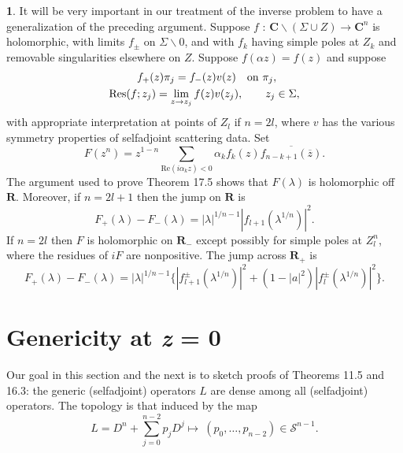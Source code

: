 \documentclass{surv-l}
\theoremstyle{plain}
\theoremstyle{definition}
\newtheorem{rrk}[theorem]{\sc{Remarks}}
\numberwithin{equation}{chapter}
\begin{document}
\begin{rrk}\label{rem17.16}
It will be very important in our treatment of the inverse problem to have a generalization of the preceding argument. Suppose $f$ : $\mathbf{C}\backslash (\Sigma\cup Z)\rightarrow \mathbf{C}^{n}$ is holomorphic, with limits $ f_{\pm}$ on $\Sigma\backslash 0$, and with $f_{k}$ having simple poles at $Z_{k}$ and removable singularities elsewhere on $Z$. Suppose $f(\alpha z)=f(z)$ and suppose
\setcounter{equation}{16}
\begin{align}
&f_{+}(z)\pi_{j}=f_{-}(z)v(z)\quad \mathrm{on}\ \pi_{j},\\ \notag
\mathrm{Res}(f&;z_{j})=\lim_{z\rightarrow z_{j}}f(z)v(z_{j}),\qquad z_{j}\in\Sigma,
\end{align}
with appropriate interpretation at points of $Z_{l}$ if $n=2l$, where $v$ has the various symmetry properties of selfadjoint scattering data. Set
\begin{equation*}
F(z^{n})=z^{1-n}\sum_{\mathrm{Re}(i\alpha_{k}z)<0}\alpha_{k}f_{k}(z)\overline{f_{n-k+1}(\overline{z})}.
\end{equation*}
The argument used to prove Theorem 17.5 shows that $F(\lambda)$ is holomorphic off $\mathbf{R}$. Moreover, if $n=2l+1$ then the jump on $\mathbf{R}$ is
\begin{equation*}
F_{+}(\lambda)-F_{-}(\lambda)=|\lambda|^{1/n-1}|f_{l+1}(\lambda^{1/n})|^{2}.
\end{equation*}
If $n=2l$ then $F$ is holomorphic on $\mathbf{R}_{-}$ except possibly for simple poles at $Z_{l}^{n}$, where the residues of $iF$ are nonpositive. The jump across $\mathbf{R}_{+}$ is
\begin{equation*}
F_{+}(\lambda)-F_{-}(\lambda)=|\lambda|^{1/n-1}\{|f_{l+1}^{\pm}(\lambda^{1/n})|^{2}+(1-|a|^{2})|f_{l}^{\pm}(\lambda^{1/n})|^{2}\}.
\end{equation*}
\end{rrk}

\section{Genericity at \emph{z} = 0}\label{sec18}
Our goal in this section and the next is to sketch proofs of Theorems 11.5 and 16.3: the generic (selfadjoint) operators $L$ are dense among all (selfadjoint) operators. The topology is that induced by the map
\begin{equation*}
L=D^{n}+\sum_{j=0}^{n-2}p_{j}D^{j}\mapsto\ (p_{0},\ldots,p_{n-2})\in \mathscr{S}^{n-1}.
\end{equation*}
\end{document}
